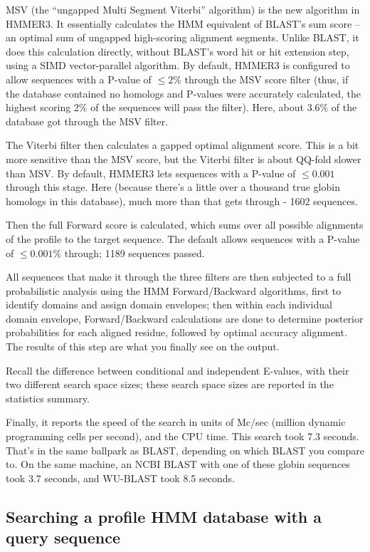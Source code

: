 MSV (the ``ungapped Multi Segment Viterbi'' algorithm) is the new
algorithm in HMMER3. It essentially calculates the HMM equivalent of
BLAST's sum score -- an optimal sum of ungapped high-scoring alignment
segments. Unlike BLAST, it does this calculation directly, without
BLAST's word hit or hit extension step, using a SIMD vector-parallel
algorithm. By default, HMMER3 is configured to allow sequences with a
P-value of $\leq 2$\% through the MSV score filter (thus, if the
database contained no homologs and P-values were accurately
calculated, the highest scoring 2\% of the sequences will pass the
filter). Here, about 3.6\% of the database got through the MSV filter.

The Viterbi filter then calculates a gapped optimal alignment score.
This is a bit more sensitive than the MSV score, but the Viterbi
filter is about QQ-fold slower than MSV. By default, HMMER3 lets
sequences with a P-value of $\leq 0.001$ through this stage. Here
(because there's a little over a thousand true globin homologs in this
database), much more than that gets through - 1602 sequences.

Then the full Forward score is calculated, which sums over all
possible alignments of the profile to the target sequence. The default
allows sequences with a P-value of $\leq 0.001$\% through; 1189
sequences passed.

All sequences that make it through the three filters are then
subjected to a full probabilistic analysis using the HMM
Forward/Backward algorithms, first to identify domains and assign
domain envelopes; then within each individual domain envelope,
Forward/Backward calculations are done to determine posterior
probabilities for each aligned residue, followed by optimal accuracy
alignment. The results of this step are what you finally see on the
output.

Recall the difference between conditional and independent E-values,
with their two different search space sizes; these search space sizes
are reported in the statistics summary. 

Finally, it reports the speed of the search in units of Mc/sec
(million dynamic programming cells per second), and the CPU time.
This search took 7.3 seconds. That's in the same ballpark as BLAST,
depending on which BLAST you compare to. On the same machine, an NCBI
BLAST with one of these globin sequences took 3.7 seconds, and
WU-BLAST took 8.5 seconds.



\subsection{Searching a profile HMM database with a query sequence}



























